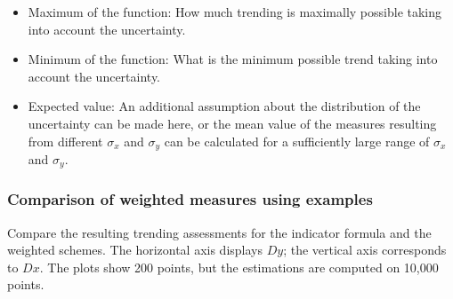 \documentclass[oneside]{article}
\theoremstyle{plain}%
\theoremstyle{definition}
\newcommand{\ydiff}{D y}
\newcommand{\xdiff}{Dx}
\begin{document}
\begin{itemize}
    \item Maximum of the function: How much trending is maximally possible taking into account the uncertainty.
    \item Minimum of the function: What is the minimum possible trend taking into account the uncertainty.
    \item Expected value: An additional assumption about the distribution of the uncertainty can be made here, or the mean value of the measures resulting from different $\sigma_x$ and $\sigma_y$ can be calculated for a sufficiently large range of $\sigma_x$ and $\sigma_y$.
\end{itemize}

\newpage
\subsubsection{Comparison of weighted measures using examples} \label{subsec:w1-w2}

Compare the resulting trending assessments for the indicator formula and the weighted schemes. The horizontal axis displays $\ydiff$; the vertical axis corresponds to $\xdiff$. 
The plots show 200 points, but the estimations are computed on 10,000 points.
\end{document}
